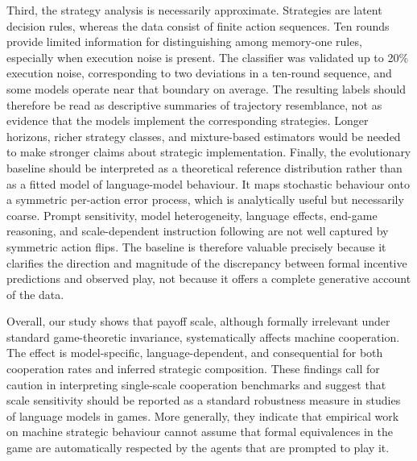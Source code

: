 \documentclass[11pt,a4paper]{article}
\begin{document}
Third, the strategy analysis is necessarily approximate. Strategies are latent decision rules, whereas the data consist of finite action sequences. Ten rounds provide limited information for distinguishing among memory-one rules, especially when execution noise is present. The classifier was validated up to 20\% execution noise, corresponding to two deviations in a ten-round sequence, and some models operate near that boundary on average. The resulting labels should therefore be read as descriptive summaries of trajectory resemblance, not as evidence that the models implement the corresponding strategies. Longer horizons, richer strategy classes, and mixture-based estimators would be needed to make stronger claims about strategic implementation.
Finally, the evolutionary baseline should be interpreted as a theoretical reference distribution rather than as a fitted model of language-model behaviour. It maps stochastic behaviour onto a symmetric per-action error process, which is analytically useful but necessarily coarse. Prompt sensitivity, model heterogeneity, language effects, end-game reasoning, and scale-dependent instruction following are not well captured by symmetric action flips. The baseline is therefore valuable precisely because it clarifies the direction and magnitude of the discrepancy between formal incentive predictions and observed play, not because it offers a complete generative account of the data. 

Overall, our study shows that payoff scale, although formally irrelevant under standard game-theoretic invariance, systematically affects machine cooperation. The effect is model-specific, language-dependent, and consequential for both cooperation rates and inferred strategic composition. These findings call for caution in interpreting single-scale cooperation benchmarks and suggest that scale sensitivity should be reported as a standard robustness measure in studies of language models in games. More generally, they indicate that empirical work on machine strategic behaviour cannot assume that formal equivalences in the game are automatically respected by the agents that are prompted to play it.



\end{document}
